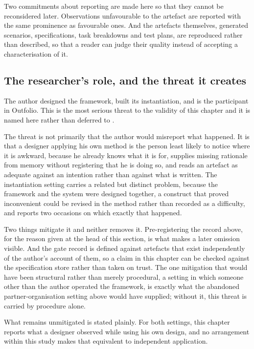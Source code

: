 Two commitments about reporting are made here so that they cannot be reconsidered later. Observations unfavourable to the artefact are reported with the same prominence as favourable ones. And the artefacts themselves, generated scenarios, specifications, task breakdowns and test plans, are reproduced rather than described, so that a reader can judge their quality instead of accepting a characterisation of it.

\subsection*{The researcher's role, and the threat it creates}

The author designed the framework, built its instantiation, and is the participant in Outfolio. This is the most serious threat to the validity of this chapter and it is named here rather than deferred to .

The threat is not primarily that the author would misreport what happened. It is that a designer applying his own method is the person least likely to notice where it is awkward, because he already knows what it is for, supplies missing rationale from memory without registering that he is doing so, and reads an artefact as adequate against an intention rather than against what is written. The instantiation setting carries a related but distinct problem, because the framework and the system were designed together, a construct that proved inconvenient could be revised in the method rather than recorded as a difficulty, and  reports two occasions on which exactly that happened.

Two things mitigate it and neither removes it. Pre-registering the record above, for the reason given at the head of this section, is what makes a later omission visible. And the gate record is defined against artefacts that exist independently of the author's account of them, so a claim in this chapter can be checked against the specification store rather than taken on trust. The one mitigation that would have been structural rather than merely procedural, a setting in which someone other than the author operated the framework, is exactly what the abandoned partner-organisation setting above would have supplied; without it, this threat is carried by procedure alone.

What remains unmitigated is stated plainly. For both settings, this chapter reports what a designer observed while using his own design, and no arrangement within this study makes that equivalent to independent application.

